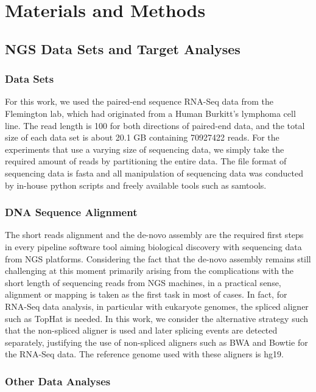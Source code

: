 \documentclass{sig-alternate}
\begin{document}
\section{Materials and Methods}\label{sec:materials_and_methods}
\subsection{NGS Data Sets and Target Analyses}
\subsubsection{Data Sets}

For this work, we used the paired-end sequence RNA-Seq data from the Flemington lab, which had originated from a Human Burkitt's lymphoma cell line\cite{erik_2010}.  The read length is 100 for both directions of paired-end data, and the total size of each data set is about 20.1 GB containing 70927422 reads.  For the experiments that use a varying size of sequencing data, we simply take the required amount of reads by partitioning the entire data.  The file format of sequencing data is fasta and all manipulation of sequencing data was conducted by in-house python scripts and freely available tools such as samtools\cite{samtools}.  

\subsubsection{DNA Sequence Alignment}

The short reads alignment and the de-novo assembly are the required first steps in every pipeline software tool aiming biological discovery with sequencing data from NGS platforms.  Considering the fact that the de-novo assembly remains still challenging at this moment primarily arising from the complications with the short length of sequencing reads from NGS machines, in a practical sense, alignment or mapping is taken as the first task in most of cases.  In fact, for RNA-Seq data analysis, in particular with eukaryote genomes, the spliced aligner such as TopHat\cite{pepke2009} is needed. In this work, we consider the alternative strategy such that the non-spliced aligner is used and later splicing events are detected separately, justifying the use of non-spliced aligners such as BWA and Bowtie for the RNA-Seq data.  The reference genome used with these aligners is hg19.

\subsubsection{Other Data Analyses}
\end{document}
